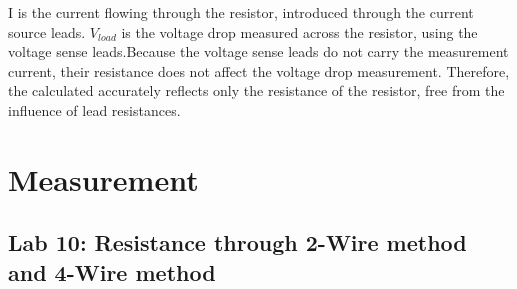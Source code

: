 \documentclass[a4paper,11pt]{article}%
\begin{document}
I is the current flowing through the resistor, introduced through the current source leads. $V_{load}$ is the voltage drop measured across the resistor, using the voltage sense leads.Because the voltage sense leads do not carry the measurement current, their resistance does not affect the voltage drop measurement. Therefore, the calculated accurately reflects only the resistance of the resistor, free from the influence of lead resistances.



\section{Measurement}


\subsection{Lab 10: Resistance through 2-Wire method and 4-Wire method}
\end{document}
